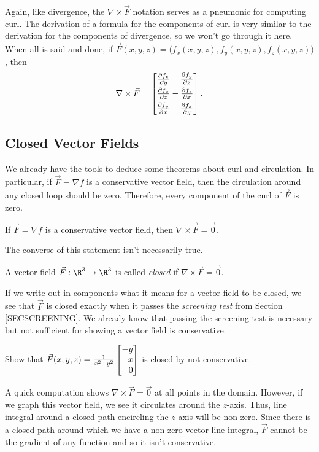 Again, like divergence, the $\nabla \times \vec F$ notation serves as a pneumonic
for computing curl.  The derivation of a formula for the components of curl
is very similar to the derivation for the components of divergence, so we won't go
through it here.  When all is said and done, if $\vec F(x,y,z) = \Big(f_x(x,y,z),f_y(x,y,z),
f_z(x,y,z)\Big)$, then
\[
	\nabla \times \vec F = \mat{
		\tfrac{\partial f_z}{\partial y} - \tfrac{\partial f_y}{\partial z}\\[4pt]
		\tfrac{\partial f_x}{\partial z} - \tfrac{\partial f_z}{\partial x}\\[4pt]
		\tfrac{\partial f_y}{\partial x} - \tfrac{\partial f_x}{\partial y}
		}.
\]

\subsection{Closed Vector Fields}
We already have the tools to deduce some theorems about curl and circulation.
In particular, if $\vec F=\nabla f$ is a conservative vector field, then the circulation
around any closed loop should be zero.  Therefore, every component of the curl of
$\vec F$ is zero.

\begin{theorem}
	If $\vec F=\nabla f$ is a conservative vector field, then $\nabla \times \vec F=\vec 0$.
\end{theorem}

The converse of this statement isn't necessarily true.

\begin{definition}
	A vector field $\vec F:\R^3\to\R^3$ is called \emph{closed}
	if $\nabla \times \vec F=\vec 0$.
\end{definition}

If we write out in components what it means for a vector field to be closed,
we see that $\vec F$ is closed exactly when it passes the \emph{screening test}
from Section \ref{SECSCREENING}.  We already know that passing the screening test
is necessary but not sufficient for showing a vector field is conservative.

\begin{example}
	Show that $\vec F(x,y,z) = \frac{1}{x^2+y^2}\mat{-y\\x\\0}$ is closed by not conservative.

	A quick computation shows $\nabla \times \vec F = \vec 0$ at all points in the domain.  However,
	if we graph this vector field, we see it circulates around the $z$-axis.  Thus, line integral
	around a closed path encircling the $z$-axis will be non-zero.  Since there is a closed path
	around which we have a non-zero vector line integral, $\vec F$ cannot be the gradient of any function
	and so it isn't conservative.
\end{example}


